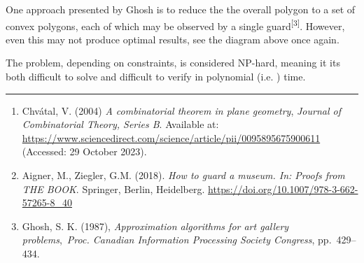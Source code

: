 \documentclass[
]{article}
\providecommand{\tightlist}{%
  \setlength{\itemsep}{0pt}\setlength{\parskip}{0pt}}
\begin{document}
One approach presented by Ghosh is to reduce the the overall polygon to
a set of convex polygons, each of which may be observed by a single
guard\textsuperscript{{[}3{]}}. However, even this may not produce
optimal results, see the diagram above once again.

The problem, depending on constraints, is considered NP-hard, meaning it
it\textquotesingle s both difficult to solve and difficult to verify in
polynomial (i.e. {}) time.

\begin{center}\rule{0.5\linewidth}{0.5pt}\end{center}

\begin{enumerate}
\tightlist
\item
  \label{fn-1-aa358eb53a96208e}{Chvátal, V. (2004)
  \emph{\textquotesingle A combinatorial theorem in plane
  geometry\textquotesingle{}}, \emph{Journal of Combinatorial Theory,
  Series B}. Available at:
  \url{https://www.sciencedirect.com/science/article/pii/0095895675900611}
  (Accessed: 29 October 2023).}
\item
  \label{fn-2-aa358eb53a96208e}{Aigner, M., Ziegler, G.M.
  (2018). \emph{\textquotesingle How to guard a museum. In: Proofs from
  THE BOOK\textquotesingle{}}. Springer, Berlin, Heidelberg.
  \url{https://doi.org/10.1007/978-3-662-57265-8_40}}
\item
  \label{fn-3-aa358eb53a96208e}{Ghosh, S. K. (1987),
  \emph{\textquotesingle Approximation algorithms for art gallery
  problems\textquotesingle{}},~\emph{Proc. Canadian Information
  Processing Society Congress}, pp.~429--434.}
\end{enumerate}
\end{document}

